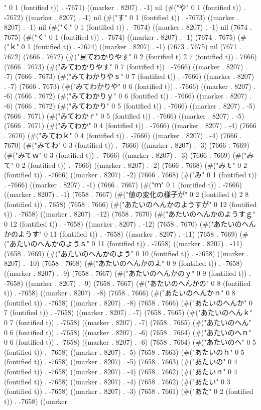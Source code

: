 " 0 1 (fontified t)) . -7671) ((marker . 8207) . -1) nil (#("や" 0 1 (fontified t)) . -7672) ((marker . 8207) . -1) nil (#("す" 0 1 (fontified t)) . -7673) ((marker . 8207) . -1) nil (#("く" 0 1 (fontified t)) . -7674) ((marker . 8207) . -1) nil (7674 . 7675) (#("く" 0 1 (fontified t)) . -7674) ((marker . 8207) . -1) (7674 . 7675) (#("ｋ" 0 1 (fontified t)) . -7674) ((marker . 8207) . -1) (7673 . 7675) nil (7671 . 7672) (7666 . 7672) (#("見てわかりやす" 0 2 (fontified t) 2 7 (fontified t)) . 7666) (7666 . 7673) (#("みてわかりやす" 0 7 (fontified t)) . -7666) ((marker . 8207) . -7) (7666 . 7673) (#("みてわかりやｓ" 0 7 (fontified t)) . -7666) ((marker . 8207) . -7) (7666 . 7673) (#("みてわかりや" 0 6 (fontified t)) . -7666) ((marker . 8207) . -6) (7666 . 7672) (#("みてわかりｙ" 0 6 (fontified t)) . -7666) ((marker . 8207) . -6) (7666 . 7672) (#("みてわかり" 0 5 (fontified t)) . -7666) ((marker . 8207) . -5) (7666 . 7671) (#("みてわかｒ" 0 5 (fontified t)) . -7666) ((marker . 8207) . -5) (7666 . 7671) (#("みてわか" 0 4 (fontified t)) . -7666) ((marker . 8207) . -4) (7666 . 7670) (#("みてわｋ" 0 4 (fontified t)) . -7666) ((marker . 8207) . -4) (7666 . 7670) (#("みてわ" 0 3 (fontified t)) . -7666) ((marker . 8207) . -3) (7666 . 7669) (#("みてｗ" 0 3 (fontified t)) . -7666) ((marker . 8207) . -3) (7666 . 7669) (#("みて" 0 2 (fontified t)) . -7666) ((marker . 8207) . -2) (7666 . 7668) (#("みｔ" 0 2 (fontified t)) . -7666) ((marker . 8207) . -2) (7666 . 7668) (#("み" 0 1 (fontified t)) . -7666) ((marker . 8207) . -1) (7666 . 7667) (#("ｍ" 0 1 (fontified t)) . -7666) ((marker . 8207) . -1) (7658 . 7667) (#("値の変化の様子が" 0 2 (fontified t) 2 8 (fontified t)) . 7658) (7658 . 7666) (#("あたいのへんかのようすが" 0 12 (fontified t)) . -7658) ((marker . 8207) . -12) (7658 . 7670) (#("あたいのへんかのようすｇ" 0 12 (fontified t)) . -7658) ((marker . 8207) . -12) (7658 . 7670) (#("あたいのへんかのようす" 0 11 (fontified t)) . -7658) ((marker . 8207) . -11) (7658 . 7669) (#("あたいのへんかのようｓ" 0 11 (fontified t)) . -7658) ((marker . 8207) . -11) (7658 . 7669) (#("あたいのへんかのよう" 0 10 (fontified t)) . -7658) ((marker . 8207) . -10) (7658 . 7668) (#("あたいのへんかのよ" 0 9 (fontified t)) . -7658) ((marker . 8207) . -9) (7658 . 7667) (#("あたいのへんかのｙ" 0 9 (fontified t)) . -7658) ((marker . 8207) . -9) (7658 . 7667) (#("あたいのへんかの" 0 8 (fontified t)) . -7658) ((marker . 8207) . -8) (7658 . 7666) (#("あたいのへんかｎ" 0 8 (fontified t)) . -7658) ((marker . 8207) . -8) (7658 . 7666) (#("あたいのへんか" 0 7 (fontified t)) . -7658) ((marker . 8207) . -7) (7658 . 7665) (#("あたいのへんｋ" 0 7 (fontified t)) . -7658) ((marker . 8207) . -7) (7658 . 7665) (#("あたいのへん" 0 6 (fontified t)) . -7658) ((marker . 8207) . -6) (7658 . 7664) (#("あたいのへｎ" 0 6 (fontified t)) . -7658) ((marker . 8207) . -6) (7658 . 7664) (#("あたいのへ" 0 5 (fontified t)) . -7658) ((marker . 8207) . -5) (7658 . 7663) (#("あたいのｈ" 0 5 (fontified t)) . -7658) ((marker . 8207) . -5) (7658 . 7663) (#("あたいの" 0 4 (fontified t)) . -7658) ((marker . 8207) . -4) (7658 . 7662) (#("あたいｎ" 0 4 (fontified t)) . -7658) ((marker . 8207) . -4) (7658 . 7662) (#("あたい" 0 3 (fontified t)) . -7658) ((marker . 8207) . -3) (7658 . 7661) (#("あた" 0 2 (fontified t)) . -7658) ((marker 